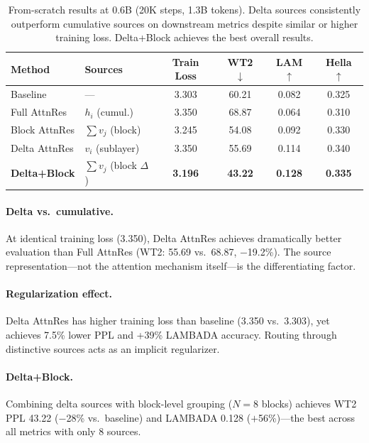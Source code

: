 \documentclass{article}
\begin{document}
\begin{table}[t]
\centering
\caption{From-scratch results at 0.6B (20K steps, 1.3B tokens). Delta sources consistently outperform cumulative sources on downstream metrics despite similar or higher training loss. Delta+Block achieves the best overall results.}
\label{tab:scratch_0.6b}
\begin{tabular}{llcccc}
\toprule
\textbf{Method} & \textbf{Sources} & \textbf{Train Loss} & \textbf{WT2 $\downarrow$} & \textbf{LAM $\uparrow$} & \textbf{Hella $\uparrow$} \\
\midrule
Baseline & --- & 3.303 & 60.21 & 0.082 & 0.325 \\
\midrule
Full AttnRes & $h_i$ (cumul.) & 3.350 & 68.87 & 0.064 & 0.310 \\
Block AttnRes & $\sum v_j$ (block) & 3.245 & 54.08 & 0.092 & 0.330 \\
Delta AttnRes & $v_i$ (sublayer) & 3.350 & 55.69 & 0.114 & 0.340 \\
\textbf{Delta+Block} & $\sum v_j$ (block $\Delta$) & \textbf{3.196} & \textbf{43.22} & \textbf{0.128} & \textbf{0.335} \\
\bottomrule
\end{tabular}
\end{table}

\paragraph{Delta vs.\ cumulative.} At identical training loss (3.350), Delta AttnRes achieves dramatically better evaluation than Full AttnRes (WT2: 55.69 vs.\ 68.87, $-$19.2\%). The source representation---not the attention mechanism itself---is the differentiating factor.

\paragraph{Regularization effect.} Delta AttnRes has higher training loss than baseline (3.350 vs.\ 3.303), yet achieves 7.5\% lower PPL and +39\% LAMBADA accuracy. Routing through distinctive sources acts as an implicit regularizer.

\paragraph{Delta+Block.} Combining delta sources with block-level grouping ($N{=}8$ blocks) achieves WT2 PPL 43.22 ($-$28\% vs.\ baseline) and LAMBADA 0.128 ($+$56\%)---the best across all metrics with only 8 sources.
\end{document}
